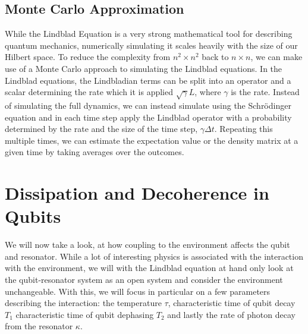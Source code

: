 \subsection{Monte Carlo Approximation}\label{sec:monte_carlo}
While the Lindblad Equation is a very strong mathematical tool for describing quantum mechanics, numerically simulating it scales heavily with the size of our Hilbert space. To reduce the complexity from $n^2\times n^2$ back to $n \times n$, we can make use of a Monte Carlo approach to simulating the Lindblad equations. In the Lindblad equations, the Lindbladian terms can be split into an operator and a scalar determining the rate which it is applied $\sqrt{\gamma}L$, where $\gamma$ is the rate. Instead of simulating the full dynamics, we can instead simulate using the Schrödinger equation and in each time step apply the Lindblad operator with a probability determined by the rate and the size of the time step, $\gamma \Delta t$. Repeating this multiple times, we can estimate the expectation value or the density matrix at a given time by taking averages over the outcomes\cite{johansson_qutip_2012}. 



\section{Dissipation and Decoherence in Qubits} \label{sec:qubit_lindblad}
We will now take a look, at how coupling to the environment affects the qubit and resonator. While a lot of interesting physics is associated with the interaction with the environment, we will with the Lindblad equation at hand only look at the qubit-resonator system as an open system and consider the environment unchangeable. With this, we will focus in particular on a few parameters describing the interaction: the temperature $\tau$, characteristic time of qubit decay $T_1$ characteristic time of qubit dephasing $T_2$ and lastly the rate of photon decay from the resonator $\kappa$.

